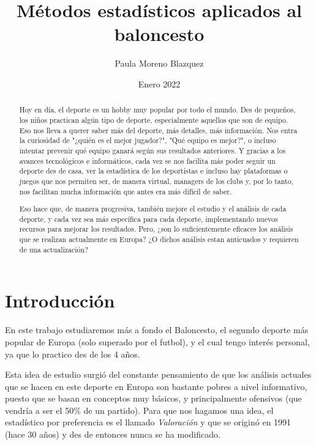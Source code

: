 \documentclass[paper=a4, fontsize=9pt]{article}
\title{Métodos estadísticos aplicados al baloncesto}
\author{Paula Moreno Blazquez}
\date{Enero 2022}
\begin{document}


\maketitle

\clearpage

\begin{abstract}

Hoy en día, el deporte es un hobby muy popular por todo el mundo. Des de pequeños, los niños practican algún tipo de deporte, especialmente aquellos que son de equipo. Eso nos lleva a querer saber más del deporte, más detalles, más información. Nos entra la curiosidad de "¿quién es el mejor jugador?", "Qué equipo es mejor?", o incluso intentar prevenir qué equipo ganará según sus resultados anteriores. Y gracias a los avances tecnológicos e informáticos, cada vez se nos facilita más poder seguir un deporte des de casa, ver la estadística de los deportistas e incluso hay plataformas o juegos que nos permiten ser, de manera virtual, managers de los clubs y, por lo tanto, nos facilitan mucha información que antes era más difícil de saber.

Eso hace que, de manera progresiva, también mejore el estudio y el análisis de cada deporte, y cada vez sea más específica para cada deporte, implementando nuevos recursos para mejorar los resultados. Pero, ¿son lo suficientemente eficaces los análisis que se realizan actualmente en Europa? ¿O dichos análisis estan anticuados y requieren de una actualización?

\end{abstract}

\pagebreak            
\newpage              

\tableofcontents

\clearpage



\section{Introducción}

En este trabajo estudiaremos más a fondo el Baloncesto, el segundo deporte más popular de Europa (solo superado por el futbol), y el cual tengo interés personal, ya que lo practico des de los 4 años.

Esta idea de estudio surgió del constante pensamiento de que los análisis actuales que se hacen en este deporte en Europa son bastante pobres a nivel informativo, puesto que se basan en conceptos muy básicos, y principalmente ofensivos (que vendría a ser el 50\% de un partido). Para que nos hagamos una idea, el estadístico por preferencia es el llamado \emph{Valoración} y que se originó en 1991 (hace 30 años) y des de entonces nunca se ha modificado.
\end{document}

